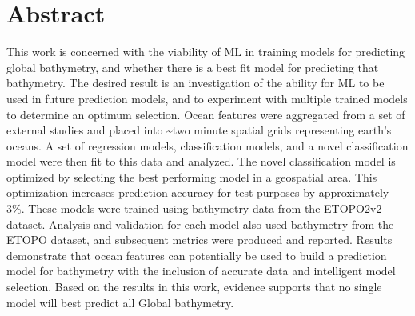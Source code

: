 \section{Abstract}
\setlength{\parindent}{10ex}
This work is concerned with the viability of \ac{ML} in training models for predicting global bathymetry, and whether there is a best fit model for predicting that bathymetry.
The desired result is an investigation of the ability for \ac{ML} to be used in future prediction models, and to experiment with multiple trained models to determine an optimum selection.
Ocean features were aggregated from a set of external studies and placed into \~{}two minute spatial grids representing earth's oceans.
A set of regression models, classification models, and a novel classification model were then fit to this data and analyzed.
The novel classification model is optimized by selecting the best performing model in a geospatial area.
This optimization increases prediction accuracy for test purposes by approximately 3\%.
These models were trained using bathymetry data from the ETOPO2v2 dataset.
Analysis and validation for each model also used bathymetry from the ETOPO dataset, and subsequent metrics were produced and reported.
Results demonstrate that ocean features can potentially be used to build a prediction model for bathymetry with the inclusion of accurate data and intelligent model selection.
Based on the results in this work, evidence supports that no single model will best predict all Global bathymetry.